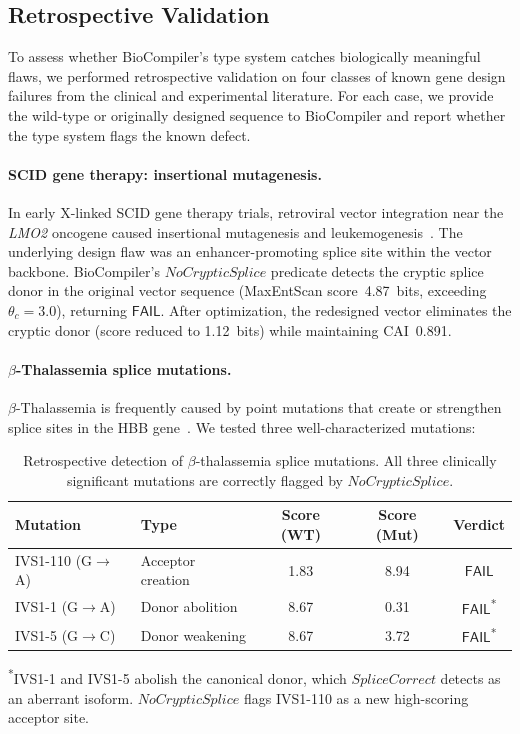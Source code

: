 \documentclass[acmsmall,review,anonymous]{acmart}
\newcommand{\FAIL}{\ensuremath{\mathsf{FAIL}}\xspace}
\begin{document}
\subsection{Retrospective Validation}\label{sec:retro}

To assess whether BioCompiler's type system catches biologically
meaningful flaws, we performed retrospective validation on four classes
of known gene design failures from the clinical and experimental
literature.  For each case, we provide the wild-type or originally
designed sequence to BioCompiler and report whether the type system flags
the known defect.

\paragraph{SCID gene therapy: insertional mutagenesis.}
In early X-linked SCID gene therapy trials, retroviral vector integration
near the \emph{LMO2} oncogene caused insertional mutagenesis and
leukemogenesis~\cite{hacein2003insertional}.  The underlying design flaw
was an enhancer-promoting splice site within the vector backbone.
BioCompiler's $\mathit{NoCrypticSplice}$ predicate detects the cryptic
splice donor in the original vector sequence (MaxEntScan score~4.87~bits,
exceeding $\theta_c = 3.0$), returning \FAIL.  After optimization, the
redesigned vector eliminates the cryptic donor (score reduced to
1.12~bits) while maintaining CAI~0.891.

\paragraph{$\beta$-Thalassemia splice mutations.}
$\beta$-Thalassemia is frequently caused by point mutations that create
or strengthen splice sites in the HBB gene~\cite{thein1998beta}.  We
tested three well-characterized mutations:

\begin{table}[t]
\centering
\caption{Retrospective detection of $\beta$-thalassemia splice
         mutations.  All three clinically significant mutations are
         correctly flagged by $\mathit{NoCrypticSplice}$.}
\label{tab:thal}
\begin{tabular}{llccc}
\toprule
\textbf{Mutation} & \textbf{Type} & \textbf{Score (WT)} &
  \textbf{Score (Mut)} & \textbf{Verdict} \\
\midrule
IVS1-110 (G$\to$A) & Acceptor creation & 1.83 & 8.94 & \FAIL \\
IVS1-1   (G$\to$A) & Donor abolition   & 8.67 & 0.31 & \FAIL\textsuperscript{*} \\
IVS1-5   (G$\to$C) & Donor weakening   & 8.67 & 3.72 & \FAIL\textsuperscript{*} \\
\bottomrule
\end{tabular}
\vspace{2pt}

{\scriptsize \textsuperscript{*}IVS1-1 and IVS1-5 abolish the canonical
donor, which $\mathit{SpliceCorrect}$ detects as an aberrant isoform.
$\mathit{NoCrypticSplice}$ flags IVS1-110 as a new high-scoring
acceptor site.}
\end{table}
\end{document}
